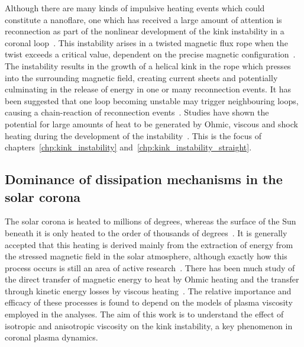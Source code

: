 Although there are many kinds of impulsive heating events which could constitute a nanoflare, one which has received a large amount of attention is reconnection as part of the nonlinear development of the kink instability in a coronal loop~\cite{hoodKinkInstabilitySolar1979,browningSolarCoronalHeating2003c,hoodCoronalHeatingMagnetic2009,browningHeatingCoronaNanoflares2008a}. This instability arises in a twisted magnetic flux rope when the twist exceeds a critical value, dependent on the precise magnetic configuration~\cite{hoodCoronalHeatingMagnetic2009}. The instability results in the growth of a helical kink in the rope which presses into the surrounding magnetic field, creating current sheets and potentially culminating in the release of energy in one or many reconnection events. It has been suggested that one loop becoming unstable may trigger neighbouring loops, causing a chain-reaction of reconnection events~\cite{hoodMHDAvalancheModel2015}. Studies have shown the potential for large amounts of heat to be generated by Ohmic, viscous and shock heating during the development of the instability~\cite{barefordShockHeatingNumerical2015,hoodCoronalHeatingMagnetic2009}. This is the focus of chapters~\ref{chp:kink_instability} and~\ref{chp:kink_instability_straight}.

\subsection{Dominance of dissipation mechanisms in the solar corona}


The solar corona is heated to millions of degrees, whereas the surface of the Sun beneath it is only heated to the order of thousands of degrees~\cite{mandriniMagneticFieldPlasma2000}. It is generally accepted that this heating is derived mainly from the extraction of energy from the stressed magnetic field in the solar atmosphere, although exactly how this process occurs is still an area of active research~\cite{klimchukSolvingCoronalHeating2006a}. There has been much study of the direct transfer of magnetic energy to heat by Ohmic heating and the transfer through kinetic energy losses by viscous heating~\cite{klimchukSolvingCoronalHeating2006a,browningMechanismsSolarCoronal1991}. The relative importance and efficacy of these processes is found to depend on the models of plasma viscosity employed in the analyses. The aim of this work is to understand the effect of isotropic and anisotropic viscosity on the kink instability, a key phenomenon in coronal plasma dynamics.

